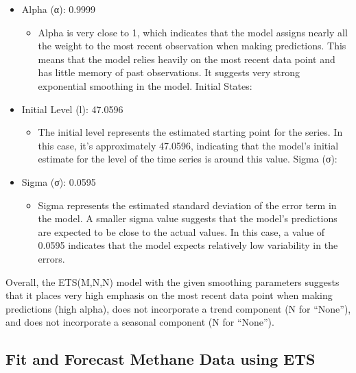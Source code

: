 \documentclass[
]{article}
\providecommand{\tightlist}{%
  \setlength{\itemsep}{0pt}\setlength{\parskip}{0pt}}
\begin{document}
\begin{itemize}
\item
  Alpha (α): 0.9999

  \begin{itemize}
  \tightlist
  \item
    Alpha is very close to 1, which indicates that the model assigns
    nearly all the weight to the most recent observation when making
    predictions. This means that the model relies heavily on the most
    recent data point and has little memory of past observations. It
    suggests very strong exponential smoothing in the model. Initial
    States:
  \end{itemize}
\item
  Initial Level (l): 47.0596

  \begin{itemize}
  \tightlist
  \item
    The initial level represents the estimated starting point for the
    series. In this case, it's approximately 47.0596, indicating that
    the model's initial estimate for the level of the time series is
    around this value. Sigma (σ):
  \end{itemize}
\item
  Sigma (σ): 0.0595

  \begin{itemize}
  \tightlist
  \item
    Sigma represents the estimated standard deviation of the error term
    in the model. A smaller sigma value suggests that the model's
    predictions are expected to be close to the actual values. In this
    case, a value of 0.0595 indicates that the model expects relatively
    low variability in the errors.
  \end{itemize}
\end{itemize}

Overall, the ETS(M,N,N) model with the given smoothing parameters
suggests that it places very high emphasis on the most recent data point
when making predictions (high alpha), does not incorporate a trend
component (N for ``None''), and does not incorporate a seasonal
component (N for ``None'').

\hypertarget{fit-and-forecast-methane-data-using-ets-1}{%
\subsection{Fit and Forecast Methane Data using
ETS}\label{fit-and-forecast-methane-data-using-ets-1}}
\end{document}
